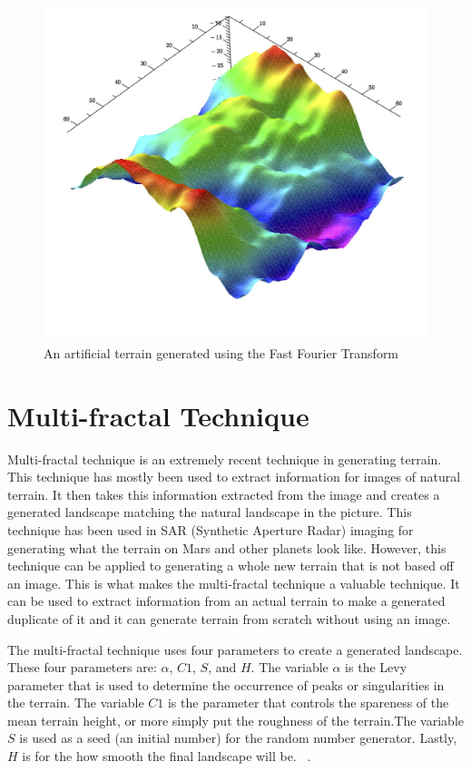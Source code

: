 \documentclass[11pt,twocolumn]{article}
\begin{document}
	\begin{figure}[ht]
	\includegraphics[scale=0.35]{FourierLandscape.jpg}
	\caption{An artificial terrain generated using the Fast Fourier Transform}
	\label{fig:fourier}
	\end{figure}

	\section{Multi-fractal Technique}
	\label{sec:multifractal}
	Multi-fractal technique is an extremely recent technique in generating terrain. This technique has mostly been used to
	extract information for images of natural terrain. It then takes this information extracted from the image and creates a generated
	landscape matching the natural landscape in the picture. This technique has been used in SAR (Synthetic Aperture Radar) imaging
	for generating what the terrain on Mars and other planets look like. However, this technique can be applied to generating a whole
	new terrain that is not based off an image.  This is what makes the multi-fractal technique a valuable technique. It can be used to
	extract information from an actual terrain to make a generated duplicate of it and it can generate terrain from scratch without
	using an image.
		
	The multi-fractal technique uses four parameters to create a generated landscape. These four parameters are: $\alpha$, $C1$, $S$,
	and $H$. The variable $\alpha$ is the Levy parameter that is used to determine the occurrence of peaks or singularities in the
	terrain. The variable $C1$ is the parameter that controls the spareness of the mean terrain height, or more simply put the
	roughness of the terrain.The variable $S$ is used as a seed (an initial number) for the random number generator. Lastly, $H$
	is for the how smooth the final landscape will be. ~\cite{PabstJense}.
	
\end{document}
